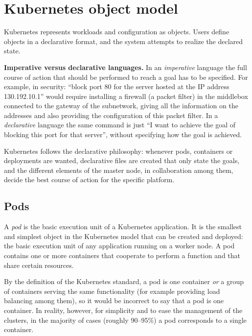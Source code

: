\section{Kubernetes object model}

Kubernetes represents workloads and configuration as objects. Users define objects in a declarative format, and the system attempts to realize the declared state.

\begin{notebox}
	\textbf{Imperative versus declarative languages.} In an \emph{imperative} language the full course of action that should be performed to reach a goal has to be specified. For example, in security: ``block port 80 for the server hosted at the IP address 130.192.10.1'' would require installing a firewall (a packet filter) in the middlebox connected to the gateway of the subnetwork, giving all the information on the addresses and also providing the configuration of this packet filter. In a \emph{declarative} language the same command is just ``I want to achieve the goal of blocking this port for that server'', without specifying how the goal is achieved.

	\medskip
	Kubernetes follows the declarative philosophy: whenever pods, containers or deployments are wanted, declarative files are created that only state the goals, and the different elements of the master node, in collaboration among them, decide the best course of action for the specific platform.
\end{notebox}

\subsection{Pods}

A \emph{pod} is the basic execution unit of a Kubernetes application. It is the smallest and simplest object in the Kubernetes model that can be created and deployed: the basic execution unit of any application running on a worker node. A pod contains one or more containers that cooperate to perform a function and that share certain resources.

By the definition of the Kubernetes standard, a pod is one container \emph{or} a group of containers serving the same functionality (for example providing load balancing among them), so it would be incorrect to say that a pod is one container. In reality, however, for simplicity and to ease the management of the clusters, in the majority of cases (roughly 90--95\%) a pod corresponds to a single container.

